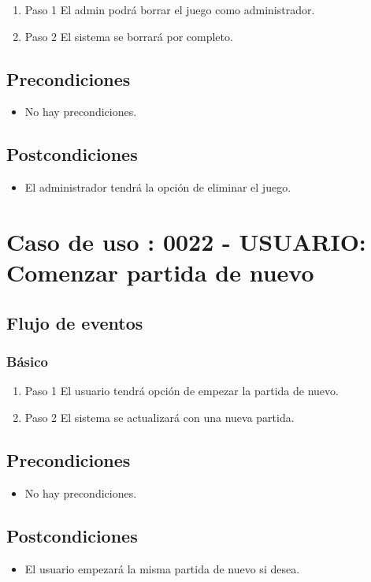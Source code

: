 \begin{enumerate}
\item Paso 1
El admin podrá borrar el juego como administrador. 
\item Paso 2
El sistema se borrará por completo. 
\end{enumerate}

\subsection{Precondiciones}
\begin{itemize}
\item No hay precondiciones.
\end{itemize}
\subsection{Postcondiciones}
\begin{itemize}
\item El administrador tendrá la opción de eliminar el juego.
\end{itemize}

\section{Caso de uso : 0022 - USUARIO: Comenzar partida de nuevo}\label{sec:uc0}

\subsection{Flujo de eventos}

\subsubsection{Básico}

\begin{enumerate}
\item Paso 1
El usuario tendrá opción de empezar la partida de nuevo. 
\item Paso 2
El sistema se actualizará con una nueva partida. 
\end{enumerate}

\subsection{Precondiciones}
\begin{itemize}
\item No hay precondiciones.
\end{itemize}
\subsection{Postcondiciones}
\begin{itemize}
\item El usuario empezará la misma partida de nuevo si desea. 
\end{itemize}